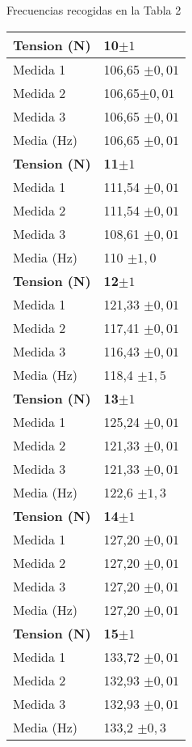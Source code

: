 \documentclass[a4paper,12pt,spanish]{article}
\begin{document}
Frecuencias recogidas en la Tabla 2


\begin{table}[H]
	\begin{minipage}[t]{.48\linewidth}
		\centering
		\begin{tabular}{|l|l|}
			\hline
			\textbf{Tension (N)} & \textbf{10}$\pm 1$ \\ \hline
			Medida 1    & 106,65 $\pm 0,01$     \\ \hline
			Medida 2    & 106,65$\pm 0,01$      \\ \hline
			Medida 3    & 106,65 $\pm 0,01$     \\ \hline
			Media (Hz)   & 106,65  $\pm 0,01$    \\ \hline\hline
			\textbf{Tension (N)} & \textbf{11}$\pm 1$ \\ \hline
			Medida 1    & 111,54 $\pm 0,01$     \\ \hline
			Medida 2    & 111,54 $\pm 0,01$     \\ \hline
			Medida 3    & 108,61 $\pm 0,01$     \\ \hline
			Media (Hz)   & 110  $\pm 1,0$    \\ \hline\hline
		\textbf{Tension (N)} & \textbf{12}$\pm 1$ \\ \hline
			Medida 1    & 121,33 $\pm 0,01$     \\ \hline
			Medida 2    & 117,41 $\pm 0,01$     \\ \hline
			Medida 3    & 116,43 $\pm 0,01$     \\ \hline
			Media (Hz)   & 118,4 $\pm 1,5$       \\ \hline\hline
		\textbf{Tension (N)} & \textbf{13}$\pm 1$ \\ \hline
			Medida 1    & 125,24 $\pm 0,01$     \\ \hline
			Medida 2    & 121,33 $\pm 0,01$     \\ \hline
			Medida 3    & 121,33 $\pm 0,01$     \\ \hline
			Media (Hz)   & 122,6 $\pm 1,3$       \\ \hline\hline
			\textbf{Tension (N)} & \textbf{14}$\pm 1$ \\ \hline
			Medida 1    & 127,20  $\pm 0,01$    \\ \hline
			Medida 2    & 127,20 $\pm 0,01$     \\ \hline
			Medida 3    & 127,20 $\pm 0,01$     \\ \hline
			Media (Hz)   & 127,20  $\pm 0,01$      \\ \hline\hline
		\textbf{Tension (N)} & \textbf{15}$\pm 1$ \\ \hline
			Medida 1    & 133,72 $\pm 0,01$     \\ \hline
			Medida 2    & 132,93 $\pm 0,01$     \\ \hline
			Medida 3    & 132,93 $\pm 0,01$     \\ \hline
			Media (Hz)   & 133,2  $\pm 0,3$      \\ \hline
		\end{tabular}
		

\end{minipage}
\end{table}
\end{document}

